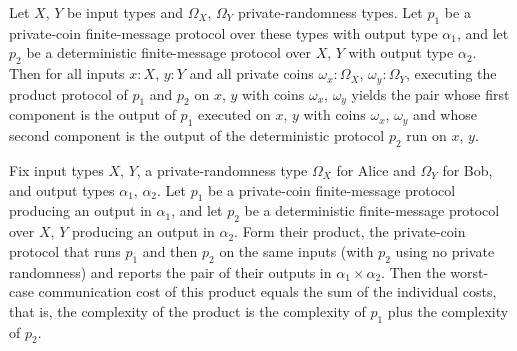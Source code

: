\begin{theorem}
\label{CommunicationComplexity.PrivateCoin.FiniteMessage.Protocol.prodDet_rrun}
\leanok
{}
Let $X$, $Y$ be input types and $\Omega_X$, $\Omega_Y$ private-randomness types. Let
$p_1$ be a private-coin finite-message protocol over these types with output type
$\alpha_1$, and let $p_2$ be a deterministic finite-message protocol over $X$, $Y$ with
output type $\alpha_2$. Then for all inputs $x : X$, $y : Y$ and all private coins
$\omega_x : \Omega_X$, $\omega_y : \Omega_Y$, executing the product protocol of $p_1$
and $p_2$ on $x$, $y$ with coins $\omega_x$, $\omega_y$ yields the pair whose first
component is the output of $p_1$ executed on $x$, $y$ with coins $\omega_x$, $\omega_y$
and whose second component is the output of the deterministic protocol $p_2$ run on $x$,
$y$.
\end{theorem}

\begin{theorem}
\label{CommunicationComplexity.PrivateCoin.FiniteMessage.Protocol.prodDet_complexity}
\leanok
{}
Fix input types $X$, $Y$, a private-randomness type $\Omega_X$ for Alice and $\Omega_Y$
for Bob, and output types $\alpha_1$, $\alpha_2$. Let $p_1$ be a private-coin
finite-message protocol producing an output in $\alpha_1$, and let $p_2$ be a
deterministic finite-message protocol over $X$, $Y$ producing an output in $\alpha_2$.
Form their product, the private-coin protocol that runs $p_1$ and then $p_2$ on the same
inputs (with $p_2$ using no private randomness) and reports the pair of their outputs in
$\alpha_1 \times \alpha_2$. Then the worst-case communication cost of this product
equals the sum of the individual costs, that is, the complexity of the product is the
complexity of $p_1$ plus the complexity of $p_2$.
\end{theorem}
